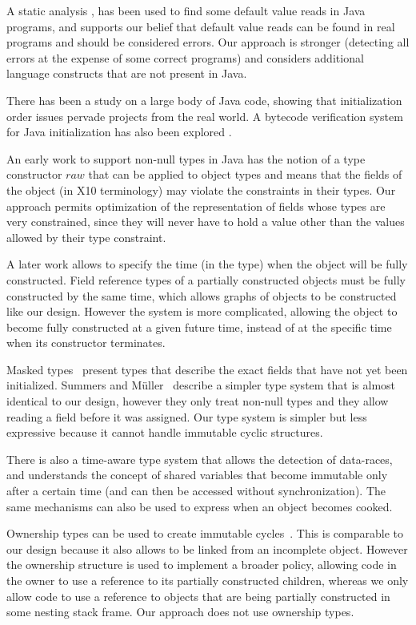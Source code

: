 A static analysis \cite{Seo:2007:SBD:1522565.1522587}, has been used to find
some default value reads in Java programs, and supports our belief that default
value reads can be found in real programs and should be considered errors.  Our
approach is stronger (detecting all errors at the expense of some correct
programs) and considers additional language constructs that are not present in
Java.

There has been a study on a large body \cite{Gil:2009:WRS:1615184.1615216} of
Java code, showing that initialization order issues pervade projects from the
real world.  A bytecode verification system for Java initialization has also
been explored \cite{Hubert:2010:ESO:1888881.1888890}.

An early work to support non-null types in Java
\cite{Fahndrich:2003:DCN:949305.949332} has the notion of a type constructor
$raw$ that can be applied to object types and means that the fields of the
object (in X10 terminology) may violate the constraints in their types.
Our approach permits optimization of the representation of fields whose types are very
constrained, since they will never have to hold a value other than the values
allowed by their type constraint.

A later work \cite{Fahndrich:2007:EOI:1297027.1297052,XinQi:2009} allows
    to specify the time
    (in the type) when the object will be fully constructed.
Field reference types of a partially constructed objects must be fully
constructed by the same time, which allows graphs of objects to be constructed
like our  design.  However the system is more complicated, allowing
the object to become fully constructed at a given future time, instead of at
the specific time when its constructor terminates.

Masked types~\cite{XinQi:2009} present types that
    describe the exact fields that have not yet been initialized.
Summers and M{\"u}ller~\cite{Summers:Mulller:2011} describe a simpler type system that is almost identical to our  design,
    however they only treat non-null types and they allow reading a field before it was assigned.
Our type system is simpler but less expressive because it cannot handle immutable cyclic structures.

There is also a time-aware type system \cite{Matsakis:2010:TTS:1869459.1869511}
that allows the detection of data-races, and understands the concept of shared
variables that become immutable only after a certain time
(and can then be accessed without synchronization).  The same mechanisms can also be
used to express when an object becomes cooked.

Ownership types can be used to create immutable cycles~\cite{Zibin:2010:OIG:1869459.1869509}.
This is comparable to
our  design because it also allows  to be linked from an
incomplete object.  However the ownership structure is used to implement a
broader policy, allowing code in the owner to use a reference to its partially
constructed children, whereas we only allow code to use a reference to objects
that are being partially constructed in some nesting stack frame.  Our
approach does not use ownership types.
